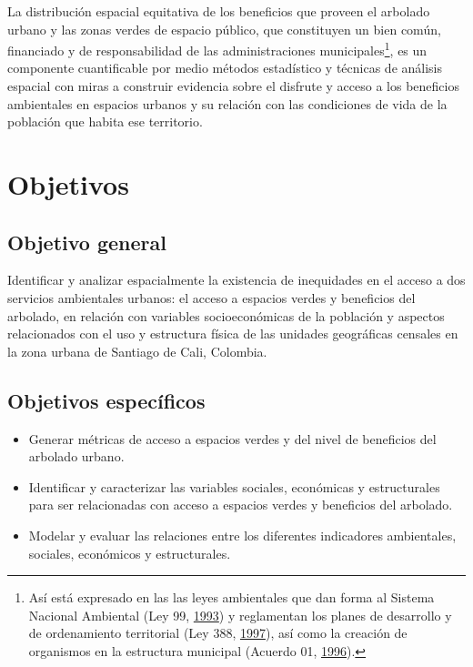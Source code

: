 \documentclass[12pt,a4paper,openany]{book}
\providecommand{\tightlist}{%
  \setlength{\itemsep}{0pt}\setlength{\parskip}{0pt}}
\let\rmarkdownfootnote\footnote%
\def\footnote{\protect\rmarkdownfootnote}
\theoremstyle{definition}
\theoremstyle{definition}
\theoremstyle{definition}
\theoremstyle{remark}
\begin{document}
La distribución espacial equitativa de los beneficios que proveen el
arbolado urbano y las zonas verdes de espacio público, que constituyen
un bien común, financiado y de responsabilidad de las administraciones
municipales\footnote{Así está expresado en las las leyes ambientales que
  dan forma al Sistema Nacional Ambiental (Ley 99,
  \protect\hyperlink{ref-ley99col}{1993}) y reglamentan los planes de
  desarrollo y de ordenamiento territorial (Ley 388,
  \protect\hyperlink{ref-ley388col}{1997}), así como la creación de
  organismos en la estructura municipal (Acuerdo 01,
  \protect\hyperlink{ref-cc_acuerdo01_1996}{1996}).}, es un componente
cuantificable por medio métodos estadístico y técnicas de análisis
espacial con miras a construir evidencia sobre el disfrute y acceso a
los beneficios ambientales en espacios urbanos y su relación con las
condiciones de vida de la población que habita ese territorio.

\section{Objetivos}\label{objetivos}

\subsection{Objetivo general}\label{objetivo-general}

Identificar y analizar espacialmente la existencia de inequidades en el
acceso a dos servicios ambientales urbanos: el acceso a espacios verdes
y beneficios del arbolado, en relación con variables socioeconómicas de
la población y aspectos relacionados con el uso y estructura física de
las unidades geográficas censales en la zona urbana de Santiago de Cali,
Colombia.

\subsection{Objetivos específicos}\label{objetivos-especificos}

\begin{itemize}
\tightlist
\item
  Generar métricas de acceso a espacios verdes y del nivel de beneficios
  del arbolado urbano.
\item
  Identificar y caracterizar las variables sociales, económicas y
  estructurales para ser relacionadas con acceso a espacios verdes y
  beneficios del arbolado.
\item
  Modelar y evaluar las relaciones entre los diferentes indicadores
  ambientales, sociales, económicos y estructurales.
\end{itemize}
\end{document}
